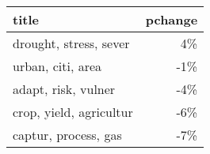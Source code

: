 \begin{tabular}{p{1.2cm}r}
\toprule
                   title &  pchange \\
\midrule
  drought, stress, sever &       4\% \\
       urban, citi, area &      -1\% \\
     adapt, risk, vulner &      -4\% \\
 crop, yield, agricultur &      -6\% \\
    captur, process, gas &      -7\% \\
\bottomrule
\end{tabular}
